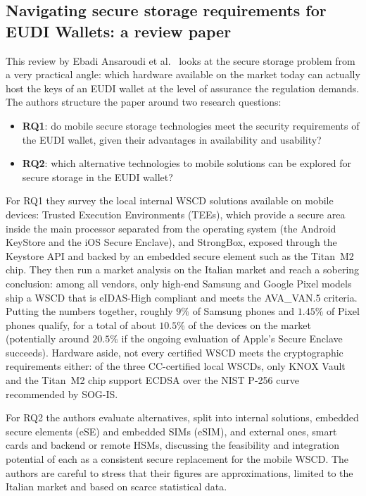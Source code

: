 \documentclass{article}
\begin{document}
\subsection{Navigating secure storage requirements for EUDI Wallets: a review paper}
\label{secstoragereq}
This review by Ebadi Ansaroudi et al.~\cite{Ansaroudi2025Navigating} looks at the secure storage problem from a very
practical angle: which hardware available on the market today can actually host the keys of an EUDI wallet at the level
of assurance the regulation demands. The authors structure the paper around two research questions:
\begin{itemize}[noitemsep]
  \item \textbf{RQ1}: do mobile secure storage technologies meet the security requirements of the EUDI wallet, given their advantages in availability and usability?
  \item \textbf{RQ2}: which alternative technologies to mobile solutions can be explored for secure storage in the EUDI wallet?
\end{itemize}

For RQ1 they survey the local internal WSCD solutions available on mobile devices: Trusted Execution Environments
(TEEs), which provide a secure area inside the main processor separated from the operating system (the Android KeyStore
and the iOS Secure Enclave), and StrongBox, exposed through the Keystore API and backed by an embedded secure element
such as the Titan~M2 chip. They then run a market analysis on the Italian market and reach a sobering conclusion: among
all vendors, only high-end Samsung and Google Pixel models ship a WSCD that is eIDAS-High compliant and meets the
AVA\_VAN.5 criteria. Putting the numbers together, roughly $9\%$ of Samsung phones and $1.45\%$ of Pixel phones
qualify, for a total of about $10.5\%$ of the devices on the market (potentially around $20.5\%$ if the ongoing
evaluation of Apple's Secure Enclave succeeds). Hardware aside, not every certified WSCD meets the cryptographic
requirements either: of the three CC-certified local WSCDs, only KNOX Vault and the Titan~M2 chip support ECDSA over
the NIST P-256 curve recommended by SOG-IS.

For RQ2 the authors evaluate alternatives, split into internal solutions, embedded secure elements (eSE) and embedded
SIMs (eSIM), and external ones, smart cards and backend or remote HSMs, discussing the feasibility and integration
potential of each as a consistent secure replacement for the mobile WSCD. The authors are careful to stress that their
figures are approximations, limited to the Italian market and based on scarce statistical data.
\end{document}
